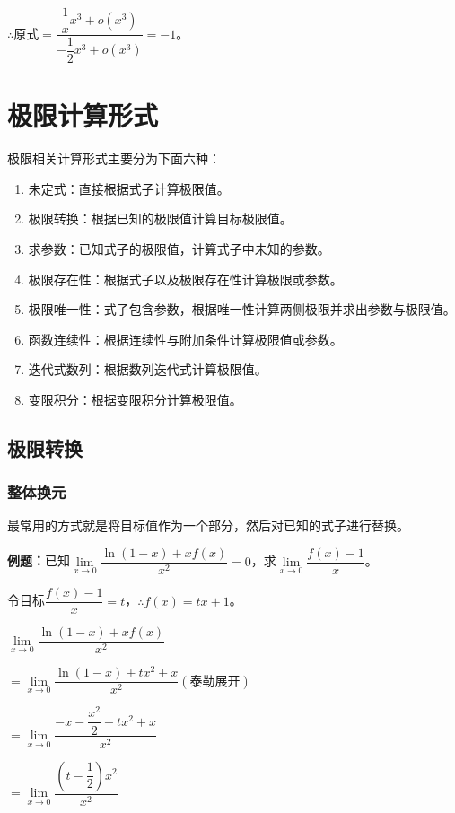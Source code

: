 \documentclass[UTF8, 12pt]{ctexart}
\begin{document}
$\therefore \text{原式}=\dfrac{\dfrac{1}{x}x^3+o(x^3)}{-\dfrac{1}{2}x^3+o(x^3)}=-1$。

\section{极限计算形式}

极限相关计算形式主要分为下面六种：

\begin{enumerate}
    \item 未定式：直接根据式子计算极限值。
    \item 极限转换：根据已知的极限值计算目标极限值。
    \item 求参数：已知式子的极限值，计算式子中未知的参数。
    \item 极限存在性：根据式子以及极限存在性计算极限或参数。
    \item 极限唯一性：式子包含参数，根据唯一性计算两侧极限并求出参数与极限值。
    \item 函数连续性：根据连续性与附加条件计算极限值或参数。
    \item 迭代式数列：根据数列迭代式计算极限值。
    \item 变限积分：根据变限积分计算极限值。
\end{enumerate}

\subsection{极限转换}

\subsubsection{整体换元}

最常用的方式就是将目标值作为一个部分，然后对已知的式子进行替换。

\textbf{例题：}已知$\lim\limits_{x\to 0}\dfrac{\ln(1-x)+xf(x)}{x^2}=0$，求$\lim\limits_{x\to 0}\dfrac{f(x)-1}{x}$。\medskip

令目标$\dfrac{f(x)-1}{x}=t$，$\therefore f(x)=tx+1$。\medskip

$\lim\limits_{x\to 0}\dfrac{\ln(1-x)+xf(x)}{x^2}$\medskip

$=\lim\limits_{x\to 0}\dfrac{\ln(1-x)+tx^2+x}{x^2} (\text{泰勒展开})$\medskip

$=\lim\limits_{x\to 0}\dfrac{-x-\dfrac{x^2}{2}+tx^2+x}{x^2}$\medskip

$=\lim\limits_{x\to 0}\dfrac{\left(t-\dfrac{1}{2}\right)x^2}{x^2}$\medskip
\end{document}
